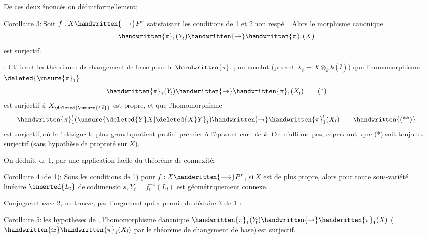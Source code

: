 De ces deux énoncés on déduit\handwritten{/}formellement;

\uline{Corollaire} 3: Soit $f:X\handwritten{\longrightarrow}P^r$ satisfaisant les conditions de 1\handwritten{,} et 2 non respé.\  Alors le morphisme canonique
\[
\handwritten{\pi}_1(Y_{\bar{t}})\handwritten{\rightarrow}\handwritten{\pi}_1(X)
\]
est surjectif.

\uline{} . Utilisant les théorèmes de changement de base pour le $\handwritten{\pi}_1$, on conclut  (posant $X_{\bar{t}}=X\otimes_k k(\bar{t})$) que l'homomorphisme $\deleted{\unsure{\pi}_1}$
\[
\handwritten{\pi}_1(Y_{\bar{t}})\handwritten{\rightarrow}\handwritten{\pi}_1(X_{\bar{t}})\tag*{(*)}
\]
est surjectif si $X_{\deleted{\unsure{t|\bar{t}}}}$ est propre, et que l'homomorphisme
\[
\handwritten{\pi}_1^{!}(\unsure{\deleted{Y}X|\deleted{X}Y}_{\bar{t}})\handwritten{\rightarrow}\handwritten{\pi}_1^{!}(X_{\bar{t}})\tag*{\handwritten{(**)}}
\]
est surjectif, où le ! désigne le plus grand quotient profini premier à l'èposant car.\ de $k$. On n'affirme pas, cependant, que (*) soit toujours surjectif (sans hypothèse de propreté sur $X$).

On déduit, de 1, par une application facile du théorème de connexité:

\uline{Corollaire} 4 (de 1): Sous les conditions de 1) pour $f:X\handwritten{\longrightarrow}P^r$, si $X$
est de plus propre, alors pour \uline{toute} sous-variété linéaire $\inserted{L_t}$ de codimensio $s$, $Y_t=f_t^{-1}(L_t)$ est géométriquement connexe.

Conjuguant avec 2, on trouve, par l'argument qui a permis de déduire 3 de 1 :

\uline{Corollaire} 5:  les hypothèses de ,  l'homomorphisme danonique $\handwritten{\pi}_1(Y_{\bar{t}})\handwritten{\rightarrow}\handwritten{\pi}_1(X)$ ($\handwritten{\simeq}\handwritten{\pi}_1(X_{\bar{t}})$ par le théorème de changement de base) est surjectif.

